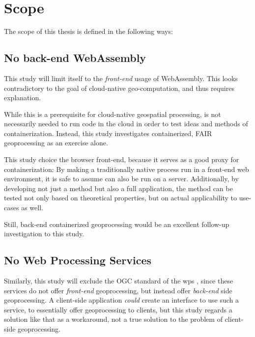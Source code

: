 
\newpage
\section{Scope}
The scope of this thesis is defined in the following ways: 


\subsection*{ No back-end WebAssembly } 
This study will limit itself to the \emph{front-end} usage of WebAssembly. This looks contradictory to the goal of cloud-native geo-computation, and thus requires explanation.

While this is a prerequisite for cloud-native geospatial processing, is not necessarily needed to run code in the cloud in order to test ideas and methods of containerization. 
Instead, this study investigates containerized, FAIR geoprocessing as an exercise alone.  


This study choice the browser front-end, because it serves as a good proxy for containerization:
By making a traditionally native process run in a front-end web environment, it is safe to assume can also be run on a server. 
Additionally, by developing not just a method but also a full application, the method can be tested not only based on theoretical properties, but on actual applicability to use-cases as well. 

Still, back-end containerized geoprocessing would be an excellent follow-up investigation to this study. 

\subsection*{ No Web Processing Services } 
Similarly, this study will exclude the OGC standard of the \ac{wps} \cite{ogc_web_2015}, since these services do not offer \emph{front-end} geoprocessing, but instead offer \emph{back-end} side geoprocessing. A client-side application \textit{could} create an interface to use such a service, to essentially offer geoprocessing to clients, but this study regards a solution like that as a workaround, not a true solution to the problem of client-side geoprocessing. 

